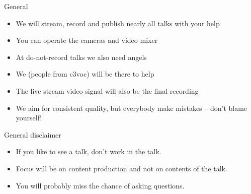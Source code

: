 
\begin{frame}{General}
	\begin{itemize}
		\item We will stream, record and publish nearly all talks with your help
		\item You can operate the cameras and video mixer
		\item At do-not-record talks we also need angels %
		\item We (people from c3voc) will be there to help
		\item The live stream video signal will also be the final recording
		\item We aim for consistent quality, but everybody make mistakes -- don't blame yourself!
	\end{itemize}
\end{frame}

\begin{frame}{General disclaimer}
  \begin{itemize}
    \item If you like to see a talk, don't work in the talk.
    \item Focus will be on content production and not on contents of the talk.
    \item You will probably miss the chance of asking questions.
  \end{itemize}
\end{frame}

